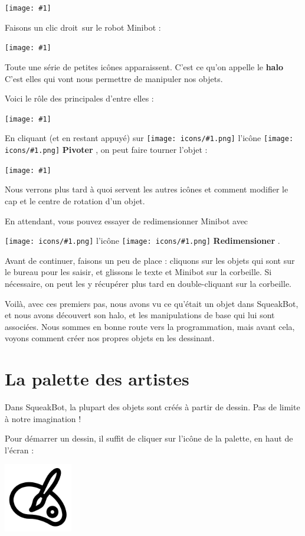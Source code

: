 \documentclass[a4paper,12pt]{book}
\def\appName{SqueakBot}
\def\cd{clic droit~}
\newcommand{\capture}[1]
{
\begin{center}
	\texttt{[image: \#1]}
\end{center}
}
\newcommand{\important}[1]{\textbf{#1}}
\newcommand{\motcle}[2]{\important{\gls{#1}}}
\newcommand{\inserticon}[1]
{
\texttt{[image: icons/\#1.png]}
}
\newcommand{\icon}[2][]
{
\ifthenelse {\equal{#1} {}} {\inserticon{#2}} {l'icône \inserticon{#2} \important{#1}}
}
\newcommand{\afaire}[1]
{
#1
}
\begin{document}
\capture{2.png}

Faisons un \cd sur le robot Minibot : \capture{1.png}

Toute une série de petites icônes apparaissent. C'est ce qu'on appelle le
\motcle{halo}. C'est elles qui vont nous permettre de manipuler nos objets.

Voici le rôle des principales d'entre elles :

\capture{3.png}

En cliquant (et en restant appuyé) sur\icon[Pivoter]{pivoter}, on peut faire
tourner l'objet :

\capture{4.png}

Nous verrons plus tard à quoi servent les autres icônes et comment modifier le
cap et le centre de rotation d'un objet.

\afaire{ En attendant, vous pouvez essayer de redimensionner Minibot avec
\icon[Redimensioner]{redimensionner}.  }

Avant de continuer, faisons un peu de place : cliquons sur les objets qui sont
sur le bureau pour les saisir, et glissons le texte et Minibot sur la
corbeille. Si nécessaire, on peut les y récupérer plus tard en double-cliquant
sur la corbeille.

Voilà, avec ces premiers pas, nous avons vu ce qu'était un objet dans \appName,
et nous avons découvert son halo, et les manipulations de base qui lui sont
associées. Nous sommes en bonne route vers la programmation, mais avant cela,
voyons comment créer nos propres objets en les dessinant.

\section{La palette des artistes}

Dans \appName, la plupart des objets sont créés à partir de dessin. Pas de
limite à notre imagination !

Pour démarrer un dessin, il suffit de cliquer sur l'icône de la palette, en
haut de l'écran :

\begin{center} \includegraphics[width=3cm]{palette.png} \end{center}
\end{document}
